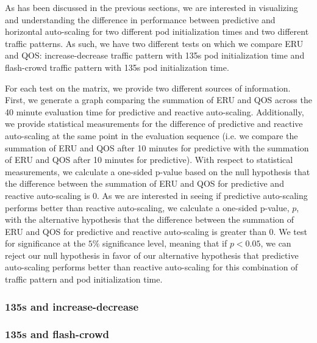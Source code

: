 As has been discussed in the previous sections, we are interested in visualizing
and understanding the difference in performance between predictive and
horizontal auto-scaling for two different pod initialization times and two
different traffic patterns. As such, we have two different tests on which we
compare ERU and QOS: increase-decrease traffic pattern with 135s pod
initialization time and flash-crowd traffic pattern with 135s pod initialization time.

For each test on the matrix, we provide two different sources of information.
First, we generate a graph comparing the summation of ERU and QOS across the 40
minute evaluation time for predictive and reactive auto-scaling. Additionally,
we provide statistical measurements for the difference of predictive and
reactive auto-scaling at the same point in the evaluation sequence (i.e. we
compare the summation of ERU and QOS after 10 minutes for predictive with the
summation of ERU and QOS after 10 minutes for predictive). With respect to
statistical measurements, we calculate a one-sided p-value
based on the null hypothesis that the difference
between the summation of ERU and QOS for predictive and reactive auto-scaling is
$0$. As we are interested in seeing if predictive auto-scaling performs better
than reactive auto-scaling, we calculate a one-sided p-value, $p$, with the alternative
hypothesis that the difference between the summation of ERU and QOS for
predictive and reactive auto-scaling is greater than $0$. We test for
significance at the $5\%$ significance level, meaning that if $p < 0.05$, we can
reject our null hypothesis in favor of our alternative hypothesis that
predictive auto-scaling performs better than reactive auto-scaling for this
combination of traffic pattern and pod initialization time.

\subsubsection{135s and increase-decrease}



\subsubsection{135s and flash-crowd}


